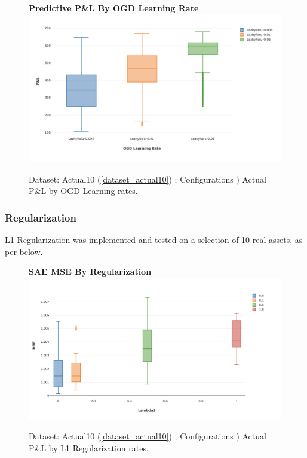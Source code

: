 \documentclass[a4paper,11pt,oneside]{article}
\theoremstyle{plain}
\theoremstyle{definition}
\begin{document}
\begin{figure}[H]
	\centering 
	\textbf{Predictive P\&L By OGD Learning Rate}
	\includegraphics[scale=0.35]{images/results/network/ogd_lr_pl.png} 
	\caption{Dataset: Actual10 (\ref{dataset_actual10}) ; Configurations )
		\newline Actual P\&L by OGD Learning rates.}
	\label{figure-ogd_lr}
\end{figure}

\subsubsection{Regularization}


L1 Regularization was implemented and tested on a selection of 10 real assets, as per below.

\begin{figure}[H]
	\centering 
	\textbf{SAE MSE By Regularization}
	\includegraphics[scale=0.35]{images/results/network/sae_l1_reg.png} 
	\caption{Dataset: Actual10 (\ref{dataset_actual10}) ; Configurations )
		\newline Actual P\&L by  L1 Regularization rates.}
	\label{figure-sgd_reg}
\end{figure}
\end{document}
